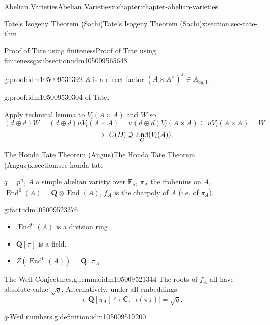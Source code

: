 \documentclass[oneside,10pt,]{book}
\newcommand{\qedhere}{\relax}
\numberwithin{equation}{section}
\newcommand{\lb}{[}
\newcommand{\rb}{]}
\newcommand{\QQ}{\mathbf{Q}}
\newcommand{\CC}{\mathbf{C}}
\newcommand{\FF}{\mathbf{F}}
\DeclareMathOperator{\End}{End}
\begin{document}
\begin{chapterptx}{Abelian Varieties}{}{Abelian Varieties}{}{}{x:chapter:chapter-abelian-varieties}
\begin{sectionptx}{Tate's Isogeny Theorem (Sachi)}{}{Tate's Isogeny Theorem (Sachi)}{}{}{x:section:sec-tate-thm}
\begin{subsectionptx}{Proof of Tate using finiteness}{}{Proof of Tate using finiteness}{}{}{g:subsection:idm105009565648}
\begin{proofptx}{}{g:proof:idm105009531392}
\(A\) is a direct factor \((A\times A^\vee)^4 \in A_{8g,1}\).%
\end{proofptx}
\begin{proofptx}{}{g:proof:idm105009530304}
of Tate.%
\par
Apply technical lemma to \(V_l(A\times A)\) and \(W\) so%
\begin{equation*}
(d\oplus d) W = (d \oplus d) uV_l(A\times A) = u(d\oplus d) V_l(A\times A) \subseteq uV_l(A\times A) = W
\end{equation*}
%
\begin{equation*}
\implies C(D) \supseteq \End_G(V_l(A))\text{.}\qedhere
\end{equation*}
%
\end{proofptx}
\end{subsectionptx}
\end{sectionptx}
%
%
\typeout{************************************************}
\typeout{************************************************}
%
\begin{sectionptx}{The Honda Tate Theorem (Angus)}{}{The Honda Tate Theorem (Angus)}{}{}{x:section:sec-honda-tate}
\begin{introduction}{}%
\(q = p^n\), \(A\) a simple abelian variety over \(\FF_q\), \(\pi_A\) the frobenius on \(A\), \(\End^0(A) = \QQ\otimes \End(A)\), \(f_A\) is the charpoly of \(A\) (i.e. of \(\pi_A\)).%
\begin{fact}{}{}{g:fact:idm105009523376}%
%
\begin{itemize}[label=\textbullet]
\item{}\(\End^0(A)\) is a division ring.%
\item{}\(\QQ\lb \pi\rb\) is a field.%
\item{}\(\displaystyle Z(\End^0(A)) = \QQ\lb \pi_A\rb\)%
\end{itemize}
%
\end{fact}
\begin{lemma}{The Weil Conjectures.}{}{g:lemma:idm105009521344}%
The roots of \(f_A\) all have absolute value \(\sqrt q\). Alternatively, under all embeddings%
\begin{equation*}
\iota \colon \QQ\lb \pi_A\rb \hookrightarrow \CC,\,|\iota(\pi_A)| = \sqrt q\text{.}
\end{equation*}
%
\end{lemma}
\begin{definition}{\(q\)-Weil numbers.}{g:definition:idm105009519200}%

\end{definition}
\end{introduction}
\end{sectionptx}
\end{chapterptx}
\end{document}
